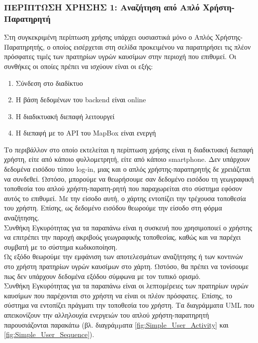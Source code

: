 \subsubsection{ΠΕΡΙΠΤΩΣΗ ΧΡΗΣΗΣ 1: Αναζήτηση από Απλό Χρήστη-Παρατηρητή }
Στη συγκεκριμένη περίπτωση χρήσης υπάρχει ουσιαστικά μόνο ο Απλός Χρήστης-Παρατηρητής, ο οποίος εισέρχεται στη σελίδα προκειμένου να παρατηρήσει τις πλέον πρόσφατες τιμές των πρατηρίων υγρών καυσίμων στην περιοχή που επιθυμεί.
Οι συνθήκες οι οποίες πρέπει να ισχύουν είναι οι εξής: 
\begin{enumerate}
	\item Σύνδεση στο διαδίκτυο
	\item Η βάση δεδομένων του backend είναι online
	\item Η διαδικτυακή διεπαφή λειτουργεί
	\item Η διεπαφή με το API του MapBox είναι ενεργή
\end{enumerate}
Το περιβάλλον στο οποίο εκτελείται η περίπτωση χρήσης είναι η διαδικτυακή διεπαφή χρήστη, είτε από κάποιο φυλλομετρητή, είτε από κάποιο smartphone.
Δεν υπάρχουν δεδομένα εισόδου τύπου log-in, μιας και ο απλός χρήστης-παρατηρητής δε χρειάζεται να συνδεθεί. Ωστόσο, μπορούμε να θεωρήσουμε σαν δεδομένο εισόδου τη γεωγραφική τοποθεσία του απλού χρήστη-παρατη-ρητή που παραχωρείται στο σύστημα εφόσον αυτός το επιθυμεί. Με την είσοδο αυτή, ο χάρτης εντοπίζει την τρέχουσα τοποθεσία του χρήστη. Επίσης, ως δεδομένο εισόδου θεωρούμε την είσοδο στη φόρμα αναζήτησης. \\
Συνθήκη Εγκυρότητας για τα παραπάνω είναι η συσκευή που χρησιμοποιεί ο χρήστης να επιτρέπει την παροχή ακριβούς γεωγραφικής τοποθεσίας, καθώς και να παρέχει συμβατή με το σύστημα κωδικοποίηση. \\
Ως εξόδο θεωρούμε την εμφάνιση των αποτελεσμάτων αναζήτησης ή των κοντινών στο χρήστη πρατηρίων υγρών καυσίμων στο χάρτη. Ωστόσο, θα πρέπει να τονίσουμε πως δεν υπάρχουν δεδομένα εξόδου σύμφωνα με τον τυπικό ορισμό. \\
Συνθήκη Εγκυρότητας για τα παραπάνω είναι  οι λεπτομέρειες των πρατηρίων υγρών καυσίμων που παρέχονται στο χρήστη να είναι οι πλέον πρόσφατες. Επίσης, το σύστημα να εντοπίζει πράγματι την τοποθεσία του χρήστη.
Τα διαγράμματα UML που απεικονίζουν την αλληλουχία ενεργειών του απλού χρήστη-παρατηρητή παρουσιάζονται παρακάτω (βλ. διαγράµµατα \ref{fig:Simple_User_Activity} και \ref{fig:Simple_User_Sequence}).
